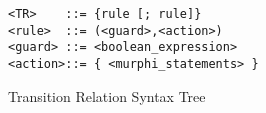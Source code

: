 \begin{figure}
\begin{verbatim} 
<TR>    ::= {rule [; rule]}
<rule>  ::= (<guard>,<action>)
<guard> ::= <boolean_expression>
<action>::= { <murphi_statements> }
\end{verbatim}
\caption{Transition Relation Syntax Tree}
\label{TRst}
\end{figure}







%
%
